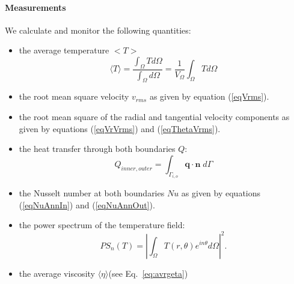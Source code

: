 \paragraph{Measurements} We calculate and monitor the following quantities:
\begin{itemize}
\item the average temperature $<T>$
\begin{equation}
\langle T \rangle = \frac{\int_\Omega T  d\Omega }{\int_\Omega d \Omega }
=\frac{1}{V_\Omega}\int_\Omega T d\Omega
\end{equation}
\item the root mean square velocity $v_{rms}$ as given by equation (\ref{eqVrms}).
\item the root mean square of the radial and tangential velocity components as given by equations (\ref{eqVrVrms}) and (\ref{eqThetaVrms}).
\item the heat transfer through both boundaries $Q$:
\begin{equation}
Q_{inner, outer} = \int_{\Gamma_{i,o}} \boldsymbol{q} \cdot \boldsymbol{{n}} \; d\Gamma 
\end{equation}
\item the Nusselt number at both boundaries $Nu$ as given by equations (\ref{eqNuAnnIn}) and  (\ref{eqNuAnnOut}). 
\item the power spectrum of the temperature field:
\begin{equation}
PS_n(T) = \left |\int_\Omega T(r, \theta) e^{in\theta} d\Omega \right |^2.
\end{equation}
\item the average viscosity $\langle \eta \rangle$(see Eq.~\ref{eq:avrgeta})
\end{itemize}

